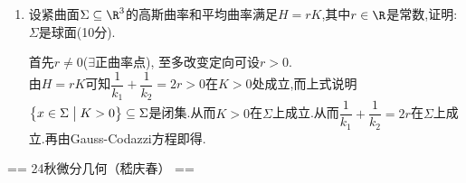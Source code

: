 \begin{enumerate}
\begin{proofc}
			$$
			K=\frac{|\Phi\times\Phi_{z}|^{2}}{|\Phi|^{2}}
			$$
			和全纯函数唯一性可得,其中$\Phi=\partial_{z}\phi$.
        \end{proofc}
        \item 设紧曲面$\Sigma\subseteq \R^{3}$的高斯曲率和平均曲率满足$H=rK$,其中$r\in\R$是常数,证明: $\Sigma$是球面(10分).
        \begin{proofc}
            首先$r\neq 0$($\exists$正曲率点), 至多改变定向可设$r>0$.\\
			由$H=rK$可知$\dfrac{1}{k_{1}}+\dfrac{1}{k_{2}}=2r>0$在$K>0$处成立,而上式说明$\left\{x\in\Sigma\bigm|K>0\right\}\subseteq\Sigma$是闭集.从而$K>0$在$\Sigma$上成立.从而$\dfrac{1}{k_{1}}+\dfrac{1}{k_{2}}=2r$在$\Sigma$上成立.再由Gauss-Codazzi方程即得.
        \end{proofc}
    \end{enumerate}

== 24秋微分几何（嵇庆春） ==

